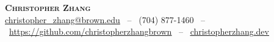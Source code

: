\begin{center}
    \textbf{\Huge \scshape Christopher Zhang} \\ \vspace{3pt}
    \small
    \href{mailto:christopher_zhang@brown.edu}{christopher\_zhang@brown.edu} \ -- \
    (704) 877-1460 \ -- \
    \href{https://github.com/christopherzhangbrown}{\underline{https://github.com/christopherzhangbrown}} \ -- \
    \href{https://christopherzhang.dev}{\underline{christopherzhang.dev}}
\end{center}
